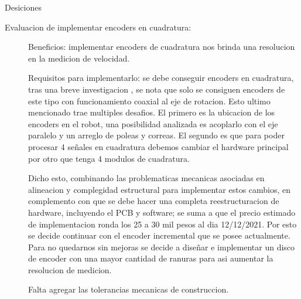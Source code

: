 \begin{titlepage}
    {\LARGE Desiciones}

    
    \begin{description}
        \item[Evaluacion de implementar encoders en cuadratura:] 
        Beneficios: implementar encoders de cuadratura nos brinda una resolucion en la medicion de velocidad.

        Requisitos para implementarlo: se debe conseguir encoders en cuadratura, tras una breve investigacion , se nota que solo se consiguen encoders de este tipo con funcionamiento coaxial al eje de rotacion. 
        Esto ultimo mencionado trae multiples desafios.
        El primero es la ubicacion de los encoders en el robot, una posibilidad analizada es acoplarlo con el eje paralelo y un arreglo de poleas y correas.
        El segundo es que para poder procesar 4 señales en cuadratura debemos cambiar el hardware principal por otro que tenga 4 modulos de cuadratura.

        Dicho esto, combinando las problematicas mecanicas asociadas en alineacion y complegidad estructural para implementar estos cambios, en complemento con que se debe hacer una completa reestructuracion de hardware, incluyendo el PCB y software; se suma a que el precio estimado de implementacion ronda los 25 a 30 mil pesos al dia 12/12/2021.
        Por esto se decide continuar con el encoder incremental que se posee actualmente.
        Para no quedarnos sin mejoras se decide a diseñar e implementar un disco de encoder con una mayor cantidad de ranuras para asi aumentar la resolucion de medicion.

        Falta agregar las tolerancias mecanicas de construccion.
        \item[] 
        \item[] 
    \end{description}
\end{titlepage}

